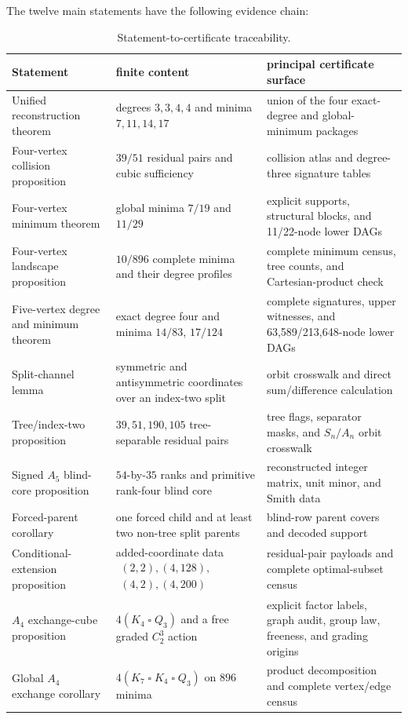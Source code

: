 The twelve main statements have the following evidence chain:
\begin{table}[H]
\centering
\small
\begin{tabularx}{\textwidth}{>{\raggedright\arraybackslash}p{}>{\raggedright\arraybackslash}p{}>{\raggedright\arraybackslash}X}
\toprule
Statement & finite content & principal certificate surface\\
\midrule
Unified reconstruction theorem & degrees $3,3,4,4$ and minima $7,11,14,17$ & union of the four exact-degree and global-minimum packages\\
Four-vertex collision proposition & $39/51$ residual pairs and cubic sufficiency & collision atlas and degree-three signature tables\\
Four-vertex minimum theorem & global minima $7/19$ and $11/29$ & explicit supports, structural blocks, and 11/22-node lower DAGs\\
Four-vertex landscape proposition & $10/896$ complete minima and their degree profiles & complete minimum census, tree counts, and Cartesian-product check\\
Five-vertex degree and minimum theorem & exact degree four and minima $14/83$, $17/124$ & complete signatures, upper witnesses, and 63,589/213,648-node lower DAGs\\
Split-channel lemma & symmetric and antisymmetric coordinates over an index-two split & orbit crosswalk and direct sum/difference calculation\\
Tree/index-two proposition & $39,51,190,105$ tree-separable residual pairs & tree flags, separator masks, and $S_n/A_n$ orbit crosswalk\\
Signed $A_5$ blind-core proposition & $54$-by-$35$ ranks and primitive rank-four blind core & reconstructed integer matrix, unit minor, and Smith data\\
Forced-parent corollary & one forced child and at least two non-tree split parents & blind-row parent covers and decoded support\\
Conditional-extension proposition & added-coordinate data
$\begin{matrix}(2,2),(4,128),\\(4,2),(4,200)\end{matrix}$ & residual-pair payloads and complete optimal-subset census\\
$A_4$ exchange-cube proposition & $4(K_4\mathbin{\square}Q_3)$ and a free graded $C_2^3$ action & explicit factor labels, graph audit, group law, freeness, and grading origins\\
Global $A_4$ exchange corollary & $4(K_7\mathbin{\square}K_4\mathbin{\square}Q_3)$ on $896$ minima & product decomposition and complete vertex/edge census\\
\bottomrule
\end{tabularx}
\caption{Statement-to-certificate traceability.}
\label{tab:statement-traceability}
\end{table}

